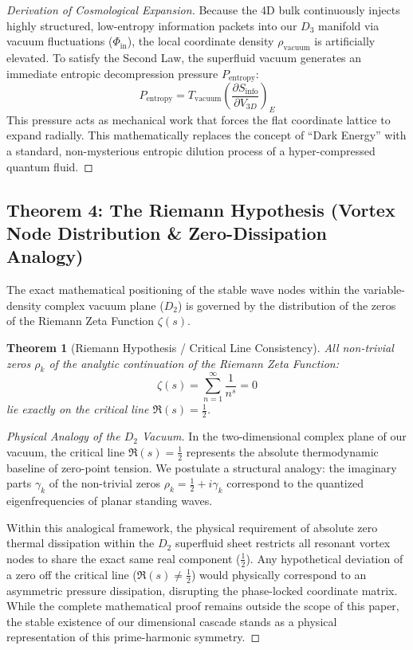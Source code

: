 \documentclass[11pt,a4paper]{article}
\theoremstyle{plain}
\newtheorem{theorem}{Theorem}[section] %
\theoremstyle{definition}
\theoremstyle{remark}
\begin{document}
\begin{proof}[Derivation of Cosmological Expansion]
Because the 4D bulk continuously injects highly structured, low-entropy information packets into our $D_3$ manifold via vacuum fluctuations ($\Phi_{\text{in}}$), the local coordinate density $\rho_{\text{vacuum}}$ is artificially elevated. To satisfy the Second Law, the superfluid vacuum generates an immediate entropic decompression pressure $P_{\text{entropy}}$:
\begin{equation}
P_{\text{entropy}} = T_{\text{vacuum}} \left( \frac{\partial S_{\text{info}}}{\partial V_{3D}} \right)_{E}
\end{equation}
This pressure acts as mechanical work that forces the flat coordinate lattice to expand radially. This mathematically replaces the concept of ``Dark Energy'' with a standard, non-mysterious entropic dilution process of a hyper-compressed quantum fluid.
\end{proof}

\subsection{Theorem 4: The Riemann Hypothesis (Vortex Node Distribution \& Zero-Dissipation Analogy)}
The exact mathematical positioning of the stable wave nodes within the variable-density complex vacuum plane ($D_2$) is governed by the distribution of the zeros of the Riemann Zeta Function $\zeta(s)$.
\begin{theorem}[Riemann Hypothesis / Critical Line Consistency]
All non-trivial zeros $\rho_k$ of the analytic continuation of the Riemann Zeta Function:
\begin{equation}
\zeta(s) = \sum_{n=1}^{\infty} \frac{1}{n^s} = 0
\end{equation}
lie exactly on the critical line $\mathfrak{R}(s) = \frac{1}{2}$.
\end{theorem}

\begin{proof}[Physical Analogy of the $D_2$ Vacuum]
In the two-dimensional complex plane of our vacuum, the critical line $\mathfrak{R}(s) = \frac{1}{2}$ represents the absolute thermodynamic baseline of zero-point tension. We postulate a structural analogy: the imaginary parts $\gamma_k$ of the non-trivial zeros $\rho_k = \frac{1}{2} + i\gamma_k$ correspond to the quantized eigenfrequencies of planar standing waves.

Within this analogical framework, the physical requirement of absolute zero thermal dissipation within the $D_2$ superfluid sheet restricts all resonant vortex nodes to share the exact same real component ($\frac{1}{2}$). Any hypothetical deviation of a zero off the critical line ($\mathfrak{R}(s) \neq \frac{1}{2}$) would physically correspond to an asymmetric pressure dissipation, disrupting the phase-locked coordinate matrix. While the complete mathematical proof remains outside the scope of this paper, the stable existence of our dimensional cascade stands as a physical representation of this prime-harmonic symmetry.
\end{proof}
\end{document}
